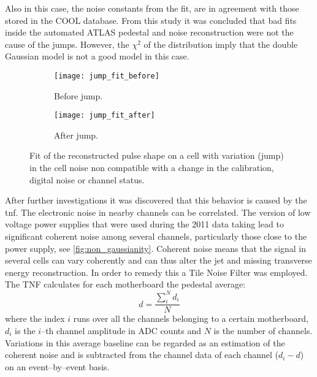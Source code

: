 Also in this case, the noise constants from the fit, are in agreement with those
stored in the COOL database. From this study it was concluded that bad fits
inside the automated ATLAS pedestal and noise reconstruction were not the cause
of the jumps. However, the $\chi^2$ of the distribution imply that the double
Gaussian model is not a good model in this case.
\begin{figure}[!h]
  \centering
  \begin{subfigure}[t]{.8\linewidth}
    \texttt{[image: jump\_fit\_before]}
    \caption{Before jump.}
    \label{fig:jump_fit_before}
  \end{subfigure}

  \begin{subfigure}[t]{.8\linewidth}
    \texttt{[image: jump\_fit\_after]}
    \caption{After jump.}
    \label{fig:jump_fit_after}
  \end{subfigure}
  \caption{Fit of the reconstructed pulse shape on a cell with variation (jump)
    in the cell noise non compatible with a change in the calibration, digital
    noise or channel status.}
  \label{fig:jump_fit}
\end{figure}

After further investigations it was discovered that this behavior is caused by
the \gls{tnf}. The electronic noise in nearby channels can be correlated. The
version of low voltage power supplies that were used during the 2011 data taking
lead to significant coherent noise among several channels, particularly those
close to the power supply, see \cref{fig:non_gaussianity}. Coherent noise means
that the signal in several cells can vary coherently and can thus alter the jet
and missing transverse energy reconstruction. In order to remedy this a Tile
Noise Filter was employed. The TNF calculates for each motherboard the pedestal
average:
\begin{equation}
  \label{eq:92}
  d = \frac{\sum_i^N d_i}{N}
\end{equation}
where the index $i$ runs over all the channels belonging to a certain
motherboard, $d_i$ is the $i$--th channel amplitude in ADC counts and $N$ is the
number of channels. Variations in this average baseline can be regarded as an
estimation of the coherent noise and is subtracted from the channel data of each
channel ($d_i - d$) on an event--by--event basis.

